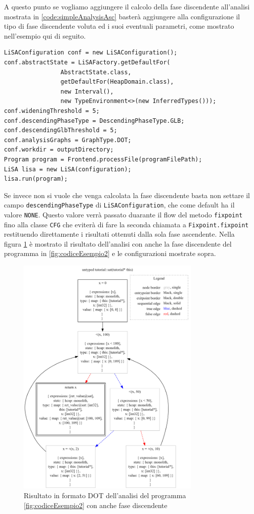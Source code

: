 A questo punto se vogliamo aggiungere il calcolo della fase discendente all'analisi mostrata in \ref{code:simpleAnalysisAsc} basterà aggiungere alla configurazione il tipo di fase discendente voluta ed i suoi eventuali parametri, come mostrato nell'esempio qui di seguito. 
\label{code:analisiDescending}
\begin{lstlisting}[belowskip=-1.1 \baselineskip]
LiSAConfiguration conf = new LiSAConfiguration();
conf.abstractState = LiSAFactory.getDefaultFor(
				AbstractState.class, 
				getDefaultFor(HeapDomain.class), 
				new Interval(),
				new TypeEnvironment<>(new InferredTypes()));
conf.wideningThreshold = 5;
conf.descendingPhaseType = DescendingPhaseType.GLB;
conf.descendingGlbThreshold = 5;
conf.analysisGraphs = GraphType.DOT;
conf.workdir = outputDirectory;
Program program = Frontend.processFile(programFilePath);
LiSA lisa = new LiSA(configuration);
lisa.run(program);
\end{lstlisting}
Se invece non si vuole che venga calcolata la fase discendente basta non settare il campo \texttt{descendingPhaseType} di \texttt{LiSAConfiguration}, che come default ha il valore \texttt{NONE}. Questo valore verrà passato duarante il flow del metodo \texttt{fixpoint} fino alla classe \texttt{CFG} che eviterà di fare la seconda chiamata a \texttt{Fixpoint.fixpoint} restituendo direttamente i risultati ottenuti dalla sola fase ascendente. Nella figura \ref{fig:risultatoDOTDesc} è mostrato il risultato dell'analisi con anche la fase discendente del programma in \ref{fig:codiceEsempio2} e le configurazioni mostrate sopra.
\begin{figure}[ht]
	\centering
	\includegraphics[width=0.8\textwidth]{Immagini/graphvizDesc.png}
	\caption{Risultato in formato DOT dell'analisi del programma \ref{fig:codiceEsempio2} con anche fase discendente}
	\label{fig:risultatoDOTDesc}
\end{figure}

